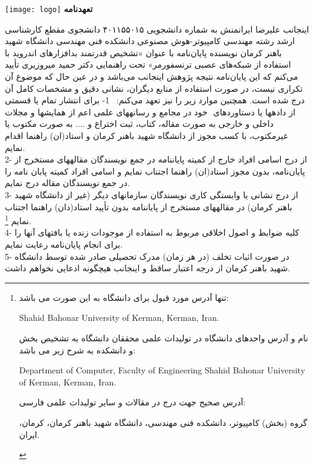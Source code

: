 \begin{center}
\texttt{[image: logo]}
\vskip -3mm
{\bfseries \fontsize{10}{11}\selectfont
	تعهدنامه}
\end{center}
{\fontsize{11}{12}\selectfont
اینجانب علیرضا ایرانمنش به شماره دانشجویی ۴۰۱۱۵۵۰۱۵ دانشجوی مقطع کارشناسی‌ ارشد رشته مهندسی کامپیوتر-هوش مصنوعی دانشکده فنی مهندسی دانشگاه شهید باهنر کرمان نویسنده پایان‌نامه با عنوان «تشخیص قدرتمند بدافزار‌های اندروید با استفاده از شبکه‌های عصبی ترنسفورمر» تحت راهنمایی دکتر حمید میروزیری تأیید می‌کنم که این پایان‌نامه نتیجه پژوهش اینجانب می‌باشد و در عین حال که موضوع آن تکراری نیست، در صورت استفاده از منابع دیگران، نشانی دقیق و مشخصات کامل آن درج شده است. همچنین موارد زیر را نیز تعهد می‌کنم:  \
1- برای انتشار تمام یا قسمتی از داده\/ها یا دستاوردهای ‌‌‌ خود در مجامع و رسانه\/های علمی اعم از همایش\/ها و مجلات داخلی و خارجی به صورت مقاله، کتاب، ثبت اختراع و .... به صورت مکتوب یا غیرمکتوب، با کسب مجوز از دانشگاه شهید باهنر کرمان و استاد(ان) راهنما اقدام نمایم. \\
2- از درج اسامی افراد خارج از کمیته پایان\/نامه در جمع نویسندگان مقاله\/های مستخرج از پایان‌نامه، بدون مجوز استاد(ان) راهنما اجتناب نمایم و اسامی افراد کمیته پابان نامه را در جمع نویسندگان مقاله درج نمایم.\\
3- از درج نشانی یا وابستگی کاری \lr{(affiliation)} نویسندگان سازمان\/های دیگر (غیر از دانشگاه شهید باهنر کرمان) در مقاله\/های مستخرج از پایان\/نامه بدون تأیید استاد(دان) راهنما اجتناب نمایم
\footnote {
	تنها آدرس مورد قبول برای دانشگاه به این صورت می باشد:
\begin{LTR}
	Shahid Bahonar University of Kerman, Kerman, Iran.
\end{LTR}
	\begin{RTL}
نام و آدرس واحدهای دانشگاه در تولیدات علمی محققان دانشگاه به تشخیص بخش و دانشکده به شرح زیر می باشد:
\end{RTL}
\begin{LTR}
	Department of Computer, Faculty of Engineering Shahid Bahonar University of Kerman, Kerman, Iran.
\end{LTR}
آدرس صحیح جهت درج در مقالات و سایر تولیدات علمی فارسی: 
\begin{RTL}
گروه (بخش) کامپیوتر، دانشکده فنی مهندسی، دانشگاه شهید باهنر کرمان، کرمان، ایران.
\end{RTL}
 }.\\
4- کلیه ضوابط و اصول اخلاقی مربوط به استفاده از موجودات زنده یا بافتهای آنها را برای انجام پایان‌نامه رعایت نمایم.\\
5- در صورت اثبات تخلف (در هر زمان) مدرک تحصیلی صادر شده توسط دانشگاه شهید باهنر کرمان از درجه اعتبار ساقط و اینجانب هیچ\/گونه ادعایی نخواهم داشت.\\
}
